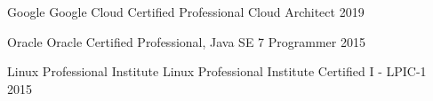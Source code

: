 
\begin{cvhonors}

    \cvhonor
    {Google}
    {Google Cloud Certified Professional Cloud Architect}
    {}
    {2019}

    \cvhonor
    {Oracle}
    {Oracle Certified Professional, Java SE 7 Programmer}
    {}
    {2015}

    \cvhonor
    {Linux Professional Institute}
    {Linux Professional Institute Certified I - LPIC-1}
    {}
    {2015}

\end{cvhonors}
